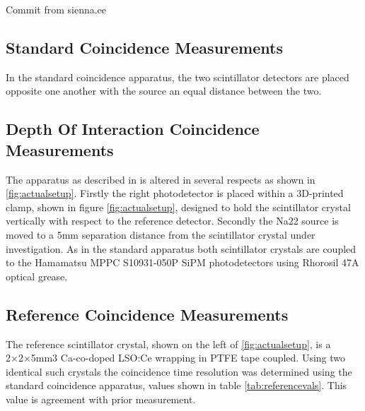 Commit from sienna.ee

\subsection{Standard Coincidence Measurements}
In the standard coincidence apparatus, the two scintillator detectors are placed opposite one another with the source an equal distance between the two.

\subsection{Depth Of Interaction Coincidence Measurements}
The apparatus as described in \cite{arron_Meyer_Pauwels_Lecoq_2012} is altered in several respects as shown in \ref{fig:actualsetup}. Firstly the right photodetector is placed within a 3D-printed clamp, shown in figure \ref{fig:actualsetup}, designed to hold the scintillator crystal vertically with respect to the reference detector. Secondly the Na22 source is moved to a 5mm separation distance from the scintillator crystal under investigation. As in the standard apparatus both scintillator crystals are coupled to the Hamamatsu MPPC S10931-050P SiPM photodetectors using Rhorosil 47A optical grease. 

\subsection{Reference Coincidence Measurements}
The reference scintillator crystal, shown on the left of \ref{fig:actualsetup}, is a 2×2×5mm3 Ca-co-doped LSO:Ce wrapping in PTFE tape coupled. Using two identical such crystals the coincidence time resolution was determined using the standard coincidence apparatus, values shown in table \ref{tab:referencevals}. This value is agreement with prior measurement\cite{arron_Meyer_Pauwels_Lecoq_2012}.
